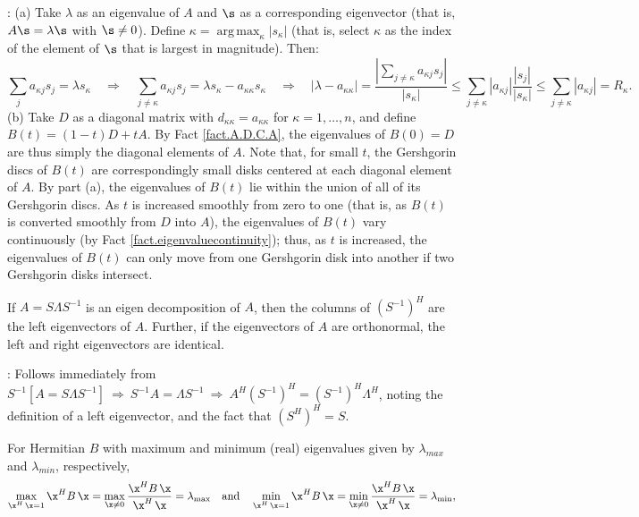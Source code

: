 \/: (a) Take $\lambda$ as an eigenvalue of $A$ and $\s$ as a corresponding eigenvector (that is, $A\s=\lambda\s$ with $\s\ne 0$).
Define $\kappa=\operatorname{arg\,max}_\kappa |s_\kappa|$ (that is, select $\kappa$ as the index of the element of $\s$ that is largest in magnitude).   Then:
\begin{equation*}
\sum_{j} a_{\kappa j} s_j = \lambda s_\kappa \quad \Rightarrow \quad
\sum_{j\ne \kappa} a_{\kappa j} s_j = \lambda s_\kappa - a_{\kappa \kappa} s_\kappa \quad \Rightarrow \quad
|\lambda - a_{\kappa \kappa}| = \frac{|\sum_{j\ne \kappa} a_{\kappa j} s_j|}{|s_\kappa|} \le
\sum_{j\ne \kappa} | a_{\kappa j}| \frac{|s_j|}{|s_\kappa|} \le \sum_{j\ne \kappa} | a_{\kappa j}| = R_\kappa.
\end{equation*}
(b) Take $D$ as a diagonal matrix with $d_{\kappa\kappa}=a_{\kappa\kappa}$ for $\kappa=1,\ldots,n$, and define $B(t)=(1-t)D+tA$.
By Fact \ref{fact.A.D.C.A}, the eigenvalues of $B(0)=D$ are thus simply the diagonal elements of $A$.
Note that, for small $t$, the Gershgorin discs of $B(t)$ are correspondingly small disks centered at each diagonal element of $A$.
By part (a), the eigenvalues of $B(t)$ lie within the union of all of its Gershgorin discs.
As $t$ is increased smoothly from zero to one (that is, as $B(t)$ is converted smoothly from $D$ into $A$),
the eigenvalues of $B(t)$ vary continuously (by Fact \ref{fact.eigenvaluecontinuity}); thus, as $t$ is increased,
the eigenvalues of $B(t)$ can only move from one Gershgorin disk into another if two Gershgorin disks intersect.\endproof

\begin{fact} \label{fact.A.D.D.Aa}
If $A = S \Lambda S^{-1}$ is an eigen decomposition of $A$, then
the columns of $(S^{-1})^{H}$ are the left eigenvectors of $A$.
Further, if the eigenvectors of $A$ are orthonormal, the left and
right eigenvectors are identical.
\end{fact}

\/: Follows immediately from $S^{-1}[A=S\Lambda
S^{-1}]\ \Rightarrow\ S^{-1}A=\Lambda S^{-1}\ \Rightarrow\
A^{H}(S^{-1})^{H}=(S^{-1})^{H}\Lambda^{H}$, noting the definition of a
left eigenvector, and the fact that $(S^{H})^{H}=S$.  \endproof

\begin{fact} \label{fact.Rayleigh.Ritz}
For Hermitian $B$ with maximum and minimum (real) eigenvalues given by $\lambda_{max}$ and $\lambda_{min}$, respectively,
\begin{equation*}
  \max_{\x^H\,\x=1} {\x^H B\, \x} = \max_{\x\ne 0} \frac{\x^H B\, \x}{\x^H\,\x} = \lambda_{\max}  \quad \textrm{and} \quad
  \min_{\x^H\,\x=1} {\x^H B\, \x} = \min_{\x\ne 0} \frac{\x^H B\, \x}{\x^H\,\x} = \lambda_{\min},
\end{equation*}
\end{fact}

